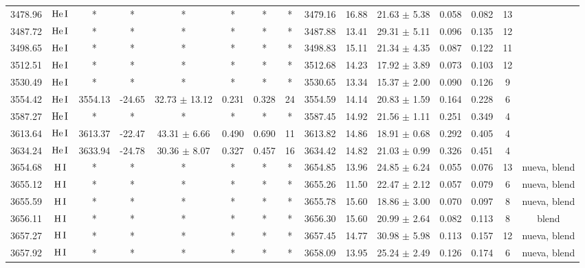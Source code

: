 \documentclass{article}
\begin{document}
\begin{table*}
\begin{adjustbox}{width=\textwidth}
\begin{tabular}{ccccccccccccccc}
3478.96 & $\mbox{He}\thinspace \mbox{I}$ & * & * & * & * & * & * & 3479.16 & 16.88 & 21.63 $\pm$ 5.38 & 0.058 & 0.082 & 13 &  \\
3487.72 & $\mbox{He}\thinspace \mbox{I}$ & * & * & * & * & * & * & 3487.88 & 13.41 & 29.31 $\pm$ 5.11 & 0.096 & 0.135 & 12 &  \\
3498.65 & $\mbox{He}\thinspace \mbox{I}$ & * & * & * & * & * & * & 3498.83 & 15.11 & 21.34 $\pm$ 4.35 & 0.087 & 0.122 & 11 &  \\
3512.51 & $\mbox{He}\thinspace \mbox{I}$ & * & * & * & * & * & * & 3512.68 & 14.23 & 17.92 $\pm$ 3.89 & 0.073 & 0.103 & 12 &  \\
3530.49 & $\mbox{He}\thinspace \mbox{I}$ & * & * & * & * & * & * & 3530.65 & 13.34 & 15.37 $\pm$ 2.00 & 0.090 & 0.126 & 9 &  \\
3554.42 & $\mbox{He}\thinspace \mbox{I}$ & 3554.13 & -24.65 & 32.73 $\pm$ 13.12 & 0.231 & 0.328 & 24 & 3554.59 & 14.14 & 20.83 $\pm$ 1.59 & 0.164 & 0.228 & 6 &  \\
3587.27 & $\mbox{He}\thinspace \mbox{I}$ & * & * & * & * & * & * & 3587.45 & 14.92 & 21.56 $\pm$ 1.11 & 0.251 & 0.349 & 4 &  \\
3613.64 & $\mbox{He}\thinspace \mbox{I}$ & 3613.37 & -22.47 & 43.31 $\pm$ 6.66 & 0.490 & 0.690 & 11 & 3613.82 & 14.86 & 18.91 $\pm$ 0.68 & 0.292 & 0.405 & 4 &  \\
3634.24 & $\mbox{He}\thinspace \mbox{I}$ & 3633.94 & -24.78 & 30.36 $\pm$ 8.07 & 0.327 & 0.457 & 16 & 3634.42 & 14.82 & 21.03 $\pm$ 0.99 & 0.326 & 0.451 & 4 &  \\
3654.68 & $\mbox{H}\thinspace \mbox{I}$ & * & * & * & * & * & * & 3654.85 & 13.96 & 24.85 $\pm$ 6.24 & 0.055 & 0.076 & 13 &  nueva, blend \\
3655.12 & $\mbox{H}\thinspace \mbox{I}$ & * & * & * & * & * & * & 3655.26 & 11.50 & 22.47 $\pm$ 2.12 & 0.057 & 0.079 & 6 &  nueva, blend \\
3655.59 & $\mbox{H}\thinspace \mbox{I}$ & * & * & * & * & * & * & 3655.78 & 15.60 & 18.86 $\pm$ 3.00 & 0.070 & 0.097 & 8 &  nueva, blend \\
3656.11 & $\mbox{H}\thinspace \mbox{I}$ & * & * & * & * & * & * & 3656.30 & 15.60 & 20.99 $\pm$ 2.64 & 0.082 & 0.113 & 8 &  blend \\
3657.27 & $\mbox{H}\thinspace \mbox{I}$ & * & * & * & * & * & * & 3657.45 & 14.77 & 30.98 $\pm$ 5.98 & 0.113 & 0.157 & 12 &  nueva, blend \\
3657.92 & $\mbox{H}\thinspace \mbox{I}$ & * & * & * & * & * & * & 3658.09 & 13.95 & 25.24 $\pm$ 2.49 & 0.126 & 0.174 & 6 &  nueva, blend \\

\end{tabular}
\end{adjustbox}
\end{table*}
\end{document}
